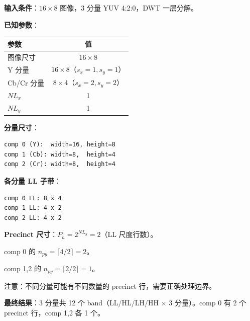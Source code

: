 \begin{examplebox}[title={例 2：4:2:0 图像的 Band 映射}]

\textbf{输入条件}：$16 \times 8$ 图像，3 分量 YUV 4:2:0，DWT 一层分解。

\medskip
\textbf{已知参数}：

\begin{tabular}{@{}lc@{}}
\toprule
参数 & 值 \\
\midrule
图像尺寸 & $16 \times 8$ \\
Y 分量 & $16 \times 8$（$s_x=1, s_y=1$） \\
Cb/Cr 分量 & $8 \times 4$（$s_x=2, s_y=2$） \\
$NL_x$ & 1 \\
$NL_y$ & 1 \\
\bottomrule
\end{tabular}

\medskip
\textbf{分量尺寸}：

\begin{lstlisting}[numbers=none]
comp 0 (Y):  width=16, height=8
comp 1 (Cb): width=8,  height=4
comp 2 (Cr): width=8,  height=4
\end{lstlisting}

\textbf{各分量 LL 子带}：

\begin{lstlisting}[numbers=none]
comp 0 LL: 8 x 4
comp 1 LL: 4 x 2
comp 2 LL: 4 x 2
\end{lstlisting}

\textbf{Precinct 尺寸}：$P_h = 2^{NL_y} = 2$（LL 尺度行数）。

comp 0 的 $n_{py} = \lceil 4 / 2 \rceil = 2$。

comp 1,2 的 $n_{py} = \lceil 2 / 2 \rceil = 1$。

注意：不同分量可能有不同数量的 precinct 行，需要正确处理边界。

\medskip
\textbf{最终结果}：3 分量共 12 个 band（LL/HL/LH/HH $\times$ 3 分量）。comp 0 有 2 个 precinct 行，comp 1,2 各 1 个。
\end{examplebox}

